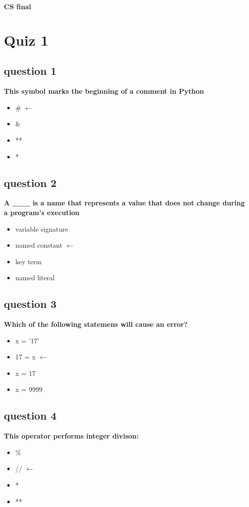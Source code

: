 \documentclass[10pt]{article}
\author{Dylan Garza}
\date
\begin{document}
\begin{titlepage}
   \begin{center}
      \Large\textbf{CS final}\\
      \large\textit{  }
   \end{center}
\end{titlepage}
\section{Quiz 1}
\subsection*{question 1}
\textbf{This symbol marks the beginning of a comment in Python}
\begin{itemize}
\item \# $\leftarrow$
\item \&
\item **
\item *
\end{itemize}

\subsection*{question 2}
\textbf{A \_\_\_ is a name that represents a value that does not change during a program's execution}
\begin{itemize}
\item variable signature
\item named constant $\leftarrow$
\item key term
\item named literal
\end{itemize}
\subsection*{question 3}
\textbf{Which of the following statemens will cause an error?}
\begin{itemize}
\item x = '17'
\item 17 = x $\leftarrow$
\item x = 17
\item x = 9999
\end{itemize}
\subsection*{question 4}
\textbf{This operator performs integer divison:}
\begin{itemize}
\item \%
\item // $\leftarrow$
\item *
\item **
\end{itemize}
\end{document}
